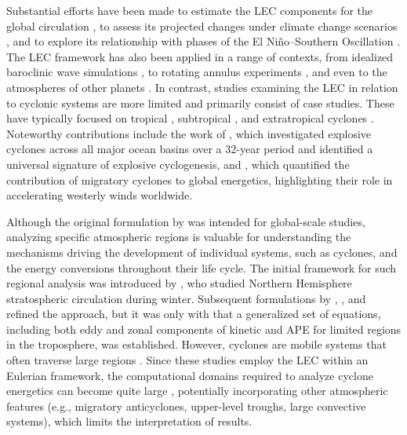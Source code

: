 \documentclass[pdflatex,sn-chicago]{sn-jnl}%
\theoremstyle{plain}
\theoremstyle{definition}
\theoremstyle{remark}
\theoremstyle{definition}
\begin{document}
Substantial efforts have been made to estimate the LEC components for the global circulation \citep[e.g.,][]{muench1965dynamics,wiin1968intensity,hu2004variations,li2007lorenz,oort2018estimates}, to assess its projected changes under climate change scenarios \citep[e.g.,][]{hernandez2010energetics,veiga2013global,pan2017earth,michaelides2021lorenz}, and to explore its relationship with phases of the El Niño–Southern Oscillation \citep{gutierrez2009multivariate}. The LEC framework has also been applied in a range of contexts, from idealized baroclinic wave simulations \citep{kirshbaum2018sensitivity,rantanen2019sensitivity}, to rotating annulus experiments \citep{young2014lorenz}, and even to the atmospheres of other planets \citep[e.g.,][]{read2020baroclinic}. In contrast, studies examining the LEC in relation to cyclonic systems are more limited and primarily consist of case studies. These have typically focused on tropical \citep{brennan1980zonal,veiga2008analysis}, subtropical \citep{michaelides1987limited,dias2013synoptic,pezza2014large,cavicchia2018energetics}, and extratropical cyclones \citep{michaelides1992spatial,wahab2002mechanism,bulic2006limited,pezza2010environmental,dias2011energy}. Noteworthy contributions include the work of \citet{black2013universal}, which investigated explosive cyclones across all major ocean basins over a 32-year period and identified a universal signature of explosive cyclogenesis, and \citet{okajima2021cyclonic}, which quantified the contribution of migratory cyclones to global energetics, highlighting their role in accelerating westerly winds worldwide.

Although the original formulation by \citet{lorenz1967nature} was intended for global-scale studies, analyzing specific atmospheric regions is valuable for understanding the mechanisms driving the development of individual systems, such as cyclones, and the energy conversions throughout their life cycle. The initial framework for such regional analysis was introduced by \citet{muench1965dynamics}, who studied Northern Hemisphere stratospheric circulation during winter. Subsequent formulations by \citet{dutton1967theory}, \citet{vincent1973some}, and \citet{smith1980energetics} refined the approach, but it was only with \citet{brennan1980zonal} that a generalized set of equations, including both eddy and zonal components of kinetic and APE for limited regions in the troposphere, was established. However, cyclones are mobile systems that often traverse large regions \citep[e.g.]{hoskins2002new,couto2024new}. Since these studies employ the LEC within an Eulerian framework, the computational domains required to analyze cyclone energetics can become quite large \citep[e.g.]{black2013universal}, potentially incorporating other atmospheric features (e.g., migratory anticyclones, upper-level troughs, large convective systems), which limits the interpretation of results.
\end{document}

